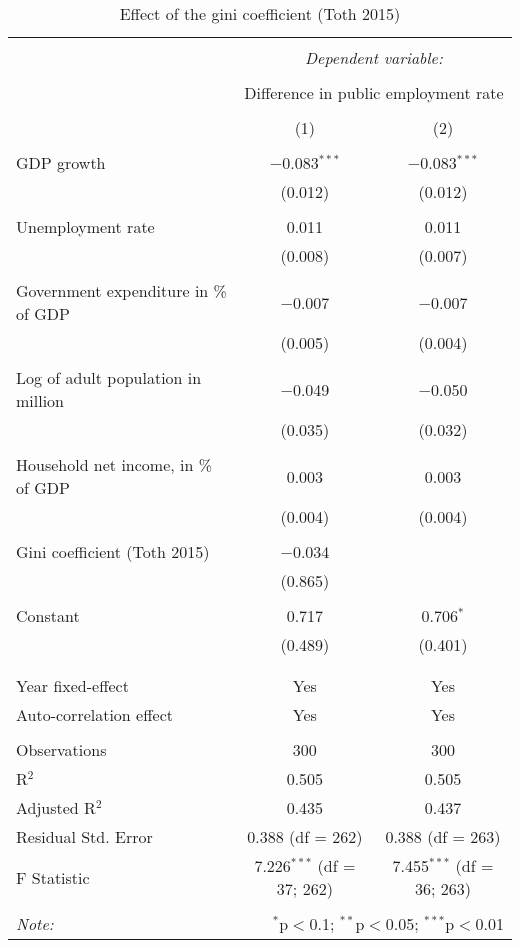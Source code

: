 
\begin{table}[!htbp] \centering 
  \caption{Effect of the gini coefficient (Toth 2015)} 
  \label{} 
\begin{tabular}{@{\extracolsep{5pt}}lcc} 
\\[-1.8ex]\hline 
\hline \\[-1.8ex] 
 & \multicolumn{2}{c}{\textit{Dependent variable:}} \\ 
\cline{2-3} 
\\[-1.8ex] & \multicolumn{2}{c}{Difference in public employment rate} \\ 
\\[-1.8ex] & (1) & (2)\\ 
\hline \\[-1.8ex] 
 GDP growth & $-$0.083$^{***}$ & $-$0.083$^{***}$ \\ 
  & (0.012) & (0.012) \\ 
  & & \\ 
 Unemployment rate & 0.011 & 0.011 \\ 
  & (0.008) & (0.007) \\ 
  & & \\ 
 Government expenditure in \% of GDP & $-$0.007 & $-$0.007 \\ 
  & (0.005) & (0.004) \\ 
  & & \\ 
 Log of adult population in million & $-$0.049 & $-$0.050 \\ 
  & (0.035) & (0.032) \\ 
  & & \\ 
 Household net income, in \% of GDP & 0.003 & 0.003 \\ 
  & (0.004) & (0.004) \\ 
  & & \\ 
 Gini coefficient (Toth 2015) & $-$0.034 &  \\ 
  & (0.865) &  \\ 
  & & \\ 
 Constant & 0.717 & 0.706$^{*}$ \\ 
  & (0.489) & (0.401) \\ 
  & & \\ 
\hline \\[-1.8ex] 
Year fixed-effect & Yes & Yes \\ 
Auto-correlation effect & Yes & Yes \\ 
\hline \\[-1.8ex] 
Observations & 300 & 300 \\ 
R$^{2}$ & 0.505 & 0.505 \\ 
Adjusted R$^{2}$ & 0.435 & 0.437 \\ 
Residual Std. Error & 0.388 (df = 262) & 0.388 (df = 263) \\ 
F Statistic & 7.226$^{***}$ (df = 37; 262) & 7.455$^{***}$ (df = 36; 263) \\ 
\hline 
\hline \\[-1.8ex] 
\textit{Note:}  & \multicolumn{2}{r}{$^{*}$p$<$0.1; $^{**}$p$<$0.05; $^{***}$p$<$0.01} \\ 
\end{tabular} 
\end{table} 
